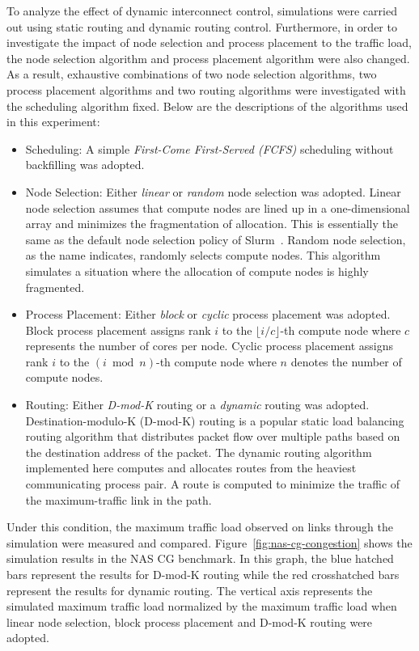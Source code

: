 To analyze the effect of dynamic interconnect control, simulations were
carried out using static routing and dynamic routing control. Furthermore, in
order to investigate the impact of node selection and process placement to the
traffic load, the node selection algorithm and process placement algorithm
were also changed. As a result, exhaustive combinations of two node selection
algorithms, two process placement algorithms and two routing algorithms were
investigated with the scheduling algorithm fixed. Below are the descriptions
of the algorithms used in this experiment:

\begin{itemize}
\item
  Scheduling: A simple \emph{First-Come First-Served (FCFS)} scheduling
  without backfilling was adopted.
\item
  Node Selection: Either \emph{linear} or \emph{random} node selection
  was adopted. Linear node selection assumes that compute nodes are
  lined up in a one-dimensional array and minimizes the fragmentation of
  allocation. This is essentially the same as the default node selection
  policy of Slurm~\autocite{Yoo2003}. Random node selection, as the name
  indicates, randomly selects compute nodes. This algorithm simulates a
  situation where the allocation of compute nodes is highly fragmented.
\item
  Process Placement: Either \emph{block} or \emph{cyclic} process
  placement was adopted. Block process placement assigns rank \(i\) to
  the \(\lfloor i / c \rfloor\)-th compute node where \(c\) represents
  the number of cores per node. Cyclic process placement assigns rank
  \(i\) to the \((i \bmod n)\)-th compute node where \(n\) denotes the
  number of compute nodes.
\item
  Routing: Either \emph{D-mod-K} routing or a \emph{dynamic} routing was
  adopted. Destination-modulo-K (\mbox{D-mod-K}) routing is a
  popular static load balancing routing algorithm that distributes
  packet flow over multiple paths based on the destination address of
  the packet. The dynamic routing algorithm implemented here computes
  and allocates routes from the heaviest communicating process pair. A
  route is computed to minimize the traffic of the maximum-traffic link
  in the path.
\end{itemize}

Under this condition, the maximum traffic load observed on links through the
simulation were measured and compared.
Figure~\ref{fig:nas-cg-congestion} shows the simulation results in
the NAS CG benchmark. In this graph, the blue hatched bars represent the
results for \mbox{D-mod-K} routing while the red crosshatched bars represent
the results for dynamic routing. The vertical axis represents the simulated
maximum traffic load normalized by the maximum traffic load when linear node
selection, block process placement and \mbox{D-mod-K} routing were adopted.


